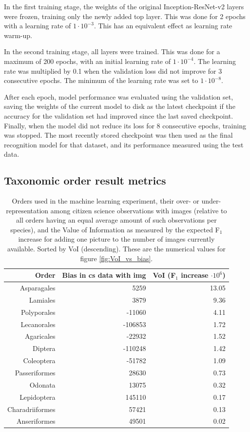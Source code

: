 \documentclass{article}
\begin{document}
In the first training stage, the weights of the original Inception-ResNet-v2 layers were frozen, training only the newly added top layer. This was done for 2 epochs with a learning rate of \(1\cdot10^{-3}\). This has an equivalent effect as learning rate warm-up.

In the second training stage, all layers were trained. This was done for a maximum of 200 epochs, with an initial learning rate of \(1\cdot10^{-4}\). The learning rate was multiplied by 0.1 when the validation loss did not improve for 3 consecutive epochs. The minimum of the learning rate was set to \(1\cdot10^{-8}\).

After each epoch, model performance was evaluated using the validation set, saving the weights of the current model to disk as the latest checkpoint if the accuracy for the validation set had improved since the last saved checkpoint. Finally, when the model did not reduce its loss for 8 consecutive epochs, training was stopped. The most recently stored checkpoint was then used as the final recognition model for that dataset, and its performance measured using the test data.


\pagebreak
\subsection*{Taxonomic order result metrics}


\begin{table}[h!]
  \centering

  \begin{tabular}{|r | r | r|}
   \hline
   \textbf{Order} & \textbf{Bias in cs data with img} & \textbf{VoI (F\boldmath$_1$ increase \boldmath$\cdot10^{6}$)} \\ [0.5ex]
   \hline
   Asparagales & 5259 & 13.05 \\
   Lamiales & 3879 & 9.36 \\
   Polyporales & -11060 & 4.11 \\
   Lecanorales & -106853 & 1.72 \\
   Agaricales & -22932 & 1.52 \\
   Diptera & -110248 & 1.42 \\
   Coleoptera & -51782 & 1.09 \\
   Passeriformes & 28630 & 0.73 \\
   Odonata & 13075 & 0.32 \\
   Lepidoptera & 145110 & 0.17 \\
   Charadriiformes & 57421 & 0.13 \\
   Anseriformes & 49501 & 0.02 \\  [1ex]
   \hline
  \end{tabular}
  \caption{\footnotesize Orders used in the machine learning experiment, their over- or under-representation among citizen science observations with images (relative to all orders having an equal average amount of such observations per species), and the Value of Information as measured by the expected F\(_1\) increase for adding one picture to the number of images currently available. Sorted by VoI (descending). These are the numerical values for figure \ref{fig:VoI_vs_bias}.}
  \label{tab:biases}
  \end{table}
\end{document}
